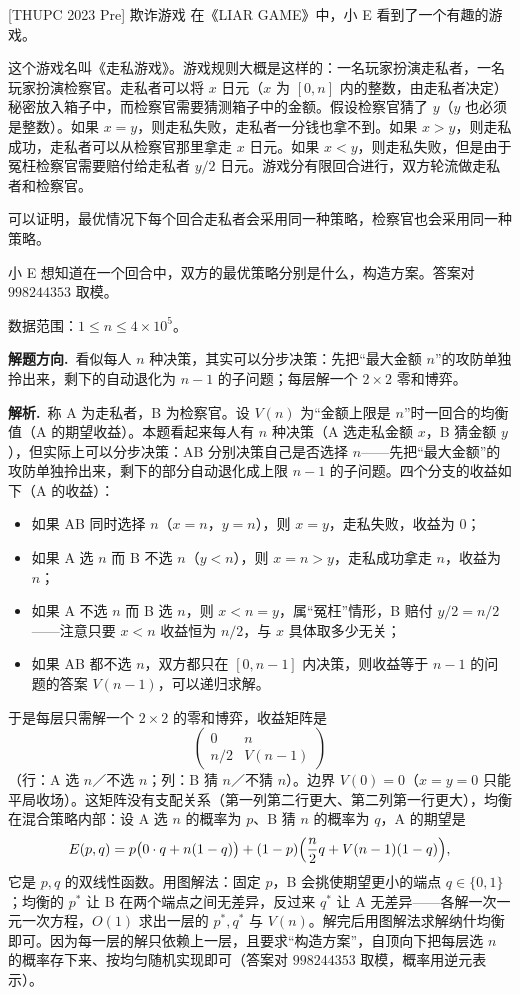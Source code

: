 \documentclass[UTF8,a4paper,11pt,oneside,openany,fontset=fandol]{ctexbook}
\theoremstyle{definition}
\newcommand{\Val}{V}
\newcommand{\sol}{\par\noindent\textbf{解析.}\ }
\newcommand{\hint}{\par\noindent\textbf{解题方向.}\ }
\begin{document}
\begin{problem}{[THUPC 2023 Pre] 欺诈游戏}
在《LIAR GAME》中，小 E 看到了一个有趣的游戏。

这个游戏名叫《走私游戏》。游戏规则大概是这样的：一名玩家扮演走私者，一名玩家扮演检察官。走私者可以将 $x$ 日元（$x$ 为 $[0,n]$ 内的整数，由走私者决定）秘密放入箱子中，而检察官需要猜测箱子中的金额。假设检察官猜了 $y$（$y$ 也必须是整数）。如果 $x=y$，则走私失败，走私者一分钱也拿不到。如果 $x>y$，则走私成功，走私者可以从检察官那里拿走 $x$ 日元。如果 $x<y$，则走私失败，但是由于冤枉检察官需要赔付给走私者 $y/2$ 日元。游戏分有限回合进行，双方轮流做走私者和检察官。

可以证明，最优情况下每个回合走私者会采用同一种策略，检察官也会采用同一种策略。

小 E 想知道在一个回合中，双方的最优策略分别是什么，构造方案。答案对 $998244353$ 取模。

数据范围：$1\le n\le4\times10^{5}$。
\end{problem}

\hint 看似每人 $n$ 种决策，其实可以分步决策：先把“最大金额 $n$”的攻防单独拎出来，剩下的自动退化为 $n-1$ 的子问题；每层解一个 $2\times2$ 零和博弈。

\sol 称 A 为走私者，B 为检察官。设 $\Val(n)$ 为“金额上限是 $n$”时一回合的均衡值（A 的期望收益）。本题看起来每人有 $n$ 种决策（A 选走私金额 $x$，B 猜金额 $y$），但实际上可以分步决策：AB 分别决策自己是否选择 $n$——先把“最大金额”的攻防单独拎出来，剩下的部分自动退化成上限 $n-1$ 的子问题。四个分支的收益如下（A 的收益）：
\begin{itemize}
\item 如果 AB 同时选择 $n$（$x=n$，$y=n$），则 $x=y$，走私失败，收益为 $0$；
\item 如果 A 选 $n$ 而 B 不选 $n$（$y<n$），则 $x=n>y$，走私成功拿走 $n$，收益为 $n$；
\item 如果 A 不选 $n$ 而 B 选 $n$，则 $x<n=y$，属“冤枉”情形，B 赔付 $y/2=n/2$——注意只要 $x<n$ 收益恒为 $n/2$，与 $x$ 具体取多少无关；
\item 如果 AB 都不选 $n$，双方都只在 $[0,n-1]$ 内决策，则收益等于 $n-1$ 的问题的答案 $\Val(n-1)$，可以递归求解。
\end{itemize}
于是每层只需解一个 $2\times2$ 的零和博弈，收益矩阵是
\[
 \begin{pmatrix}0&n\\ n/2&\Val(n-1)\end{pmatrix}
\]
（行：A 选 $n$／不选 $n$；列：B 猜 $n$／不猜 $n$）。边界 $\Val(0)=0$（$x=y=0$ 只能平局收场）。这矩阵没有支配关系（第一列第二行更大、第二列第一行更大），均衡在混合策略内部：设 A 选 $n$ 的概率为 $p$、B 猜 $n$ 的概率为 $q$，A 的期望是
\[
 E(p,q)=p\bigl(0\cdot q+n(1-q)\bigr)+(1-p)\Bigl(\frac n2 q+\Val(n-1)(1-q)\Bigr),
\]
它是 $p,q$ 的双线性函数。用图解法：固定 $p$，B 会挑使期望更小的端点 $q\in\{0,1\}$；均衡的 $p^{*}$ 让 B 在两个端点之间无差异，反过来 $q^{*}$ 让 A 无差异——各解一次一元一次方程，$O(1)$ 求出一层的 $p^{*},q^{*}$ 与 $\Val(n)$。解完后用图解法求解纳什均衡即可。因为每一层的解只依赖上一层，且要求“构造方案”，自顶向下把每层选 $n$ 的概率存下来、按均匀随机实现即可（答案对 $998244353$ 取模，概率用逆元表示）。
\end{document}
